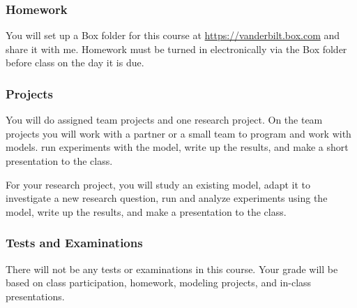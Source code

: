 \documentclass[11pt,twoside]{jgsyllabus}\usepackage[]{graphicx}\usepackage[]{color}
\begin{document}
\subsubsection{Homework}
You will set up a Box folder for this course at \url{https://vanderbilt.box.com}
and share it with me.
Homework must be turned in electronically via the Box folder
before class on the day it is due.
%
\subsubsection{Projects}
You will do assigned team projects and one research project.
On the team projects you will work with a partner or a small team to program
and work with models.
run experiments with the model, write up the results, and make a short
presentation to the class.

For your research project, you will study an existing model, adapt it to
investigate a new research question, run and analyze experiments using the
model, write up the results, and make a presentation to the class.

\subsubsection{Tests and Examinations}
There will not be any tests or examinations in this course. Your grade will be
based on class participation, homework, modeling projects, and in-class
presentations.

%
%

\end{document}

